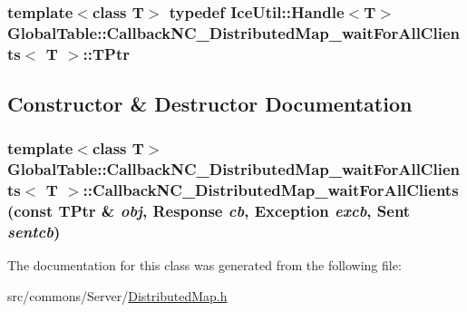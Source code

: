 \label{class_global_table_1_1_callback_n_c___distributed_map__wait_for_all_clients_a3ee9a892cbd5431e6d2cd0c48336f315}
\hypertarget{class_global_table_1_1_callback_n_c___distributed_map__wait_for_all_clients_ad382f8070b09e44e81075151fd811634}{
\subsubsection[{TPtr}]{\setlength{\rightskip}{0pt plus 5cm}template$<$class T$>$ typedef IceUtil::Handle$<$T$>$ {\bf GlobalTable::CallbackNC\_\-DistributedMap\_\-waitForAllClients}$<$ T $>$::{\bf TPtr}}}
\label{class_global_table_1_1_callback_n_c___distributed_map__wait_for_all_clients_ad382f8070b09e44e81075151fd811634}


\subsection{Constructor \& Destructor Documentation}
\hypertarget{class_global_table_1_1_callback_n_c___distributed_map__wait_for_all_clients_a129bb08f4a7d4b49cfdf4119f462909e}{
\subsubsection[{CallbackNC\_\-DistributedMap\_\-waitForAllClients}]{\setlength{\rightskip}{0pt plus 5cm}template$<$class T$>$ {\bf GlobalTable::CallbackNC\_\-DistributedMap\_\-waitForAllClients}$<$ T $>$::{\bf CallbackNC\_\-DistributedMap\_\-waitForAllClients} (const {\bf TPtr} \& {\em obj}, \/  {\bf Response} {\em cb}, \/  {\bf Exception} {\em excb}, \/  {\bf Sent} {\em sentcb})}}
\label{class_global_table_1_1_callback_n_c___distributed_map__wait_for_all_clients_a129bb08f4a7d4b49cfdf4119f462909e}


The documentation for this class was generated from the following file:\begin{DoxyCompactItemize}
\item 
src/commons/Server/\hyperlink{_distributed_map_8h}{DistributedMap.h}\end{DoxyCompactItemize}
